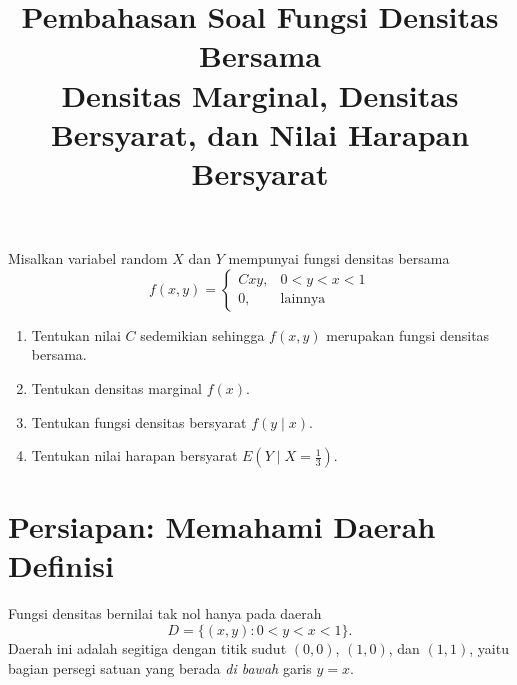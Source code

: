 \documentclass[11pt,a4paper]{article}
\title{\textbf{Pembahasan Soal Fungsi Densitas Bersama}\\[4pt]
\large Densitas Marginal, Densitas Bersyarat, dan Nilai Harapan Bersyarat}
\author{}
\date{}
\begin{document}
\maketitle

\begin{soal}
Misalkan variabel random $X$ dan $Y$ mempunyai fungsi densitas bersama
\[
f(x,y)=
\begin{cases}
Cxy, & 0<y<x<1\\[2pt]
0, & \text{lainnya}
\end{cases}
\]
\begin{enumerate}[leftmargin=*]
  \item Tentukan nilai $C$ sedemikian sehingga $f(x,y)$ merupakan fungsi densitas bersama.
  \item Tentukan densitas marginal $f(x)$.
  \item Tentukan fungsi densitas bersyarat $f(y\mid x)$.
  \item Tentukan nilai harapan bersyarat $E\!\left(Y\mid X=\tfrac13\right)$.
\end{enumerate}
\end{soal}

\section*{Persiapan: Memahami Daerah Definisi}

Fungsi densitas bernilai tak nol hanya pada daerah
\[
D=\{(x,y): 0<y<x<1\}.
\]
Daerah ini adalah segitiga dengan titik sudut $(0,0)$, $(1,0)$, dan $(1,1)$, yaitu bagian persegi satuan yang berada \emph{di bawah} garis $y=x$.

\begin{center}
\end{center}
\end{document}
